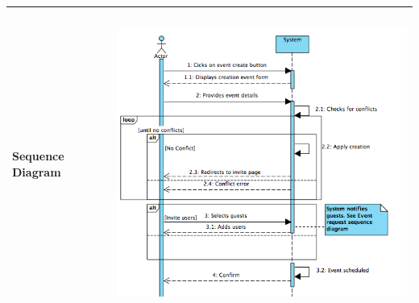 \documentclass[12pt]{book}
\begin{document}
\begin{center}
\begin{tabular}{ |l|l| }
		Sequence Diagram &  \includegraphics[width=12cm, height=10cm]{newEventSD}\\
		\hline 
  		\hline
\end{tabular} \\
\vspace*{\fill}

\end{center}
\end{document}
